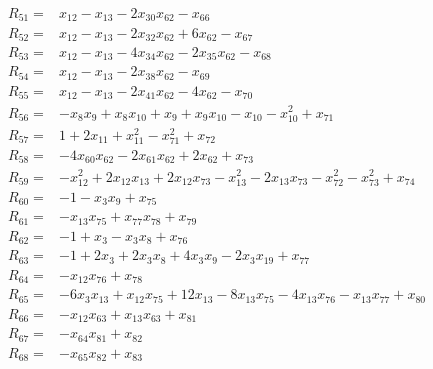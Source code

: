 \begin{align*}
R_{51} ={}& x_{12} - x_{13} - 2x_{30}x_{62} - x_{66} \\[4pt]
R_{52} ={}& x_{12} - x_{13} - 2x_{32}x_{62} + 6x_{62} - x_{67} \\[4pt]
R_{53} ={}& x_{12} - x_{13} - 4x_{34}x_{62} - 2x_{35}x_{62} - x_{68} \\[4pt]
R_{54} ={}& x_{12} - x_{13} - 2x_{38}x_{62} - x_{69} \\[4pt]
R_{55} ={}& x_{12} - x_{13} - 2x_{41}x_{62} - 4x_{62} - x_{70} \\[4pt]
R_{56} ={}& -x_{8}x_{9} + x_{8}x_{10} + x_{9} + x_{9}x_{10} - x_{10} - x_{10}^{2} + x_{71} \\[4pt]
R_{57} ={}& 1 + 2x_{11} + x_{11}^{2} - x_{71}^{2} + x_{72} \\[4pt]
R_{58} ={}& -4x_{60}x_{62} - 2x_{61}x_{62} + 2x_{62} + x_{73} \\[4pt]
R_{59} ={}& -x_{12}^{2} + 2x_{12}x_{13} + 2x_{12}x_{73} - x_{13}^{2} - 2x_{13}x_{73} - x_{72}^{2} - x_{73}^{2} + x_{74} \\[4pt]
R_{60} ={}& -1 - x_{3}x_{9} + x_{75} \\[4pt]
R_{61} ={}& -x_{13}x_{75} + x_{77}x_{78} + x_{79} \\[4pt]
R_{62} ={}& -1 + x_{3} - x_{3}x_{8} + x_{76} \\[4pt]
R_{63} ={}& -1 + 2x_{3} + 2x_{3}x_{8} + 4x_{3}x_{9} - 2x_{3}x_{19} + x_{77} \\[4pt]
R_{64} ={}& -x_{12}x_{76} + x_{78} \\[4pt]
R_{65} ={}& -6x_{3}x_{13} + x_{12}x_{75} + 12x_{13} - 8x_{13}x_{75} - 4x_{13}x_{76} - x_{13}x_{77} + x_{80} \\[4pt]
R_{66} ={}& -x_{12}x_{63} + x_{13}x_{63} + x_{81} \\[4pt]
R_{67} ={}& -x_{64}x_{81} + x_{82} \\[4pt]
R_{68} ={}& -x_{65}x_{82} + x_{83} \\[4pt]

\end{align*}
